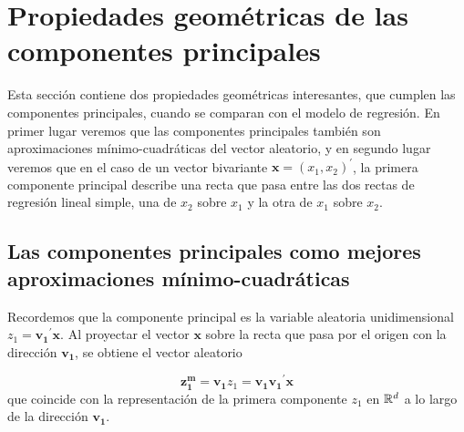 \documentclass[
  a4paper,
  oneside]{scrbook}
\newenvironment{Shaded}{\begin{snugshade}}{\end{snugshade}}
\newcommand{\DecValTok}[1]{\textcolor[rgb]{0.00,0.00,0.81}{#1}}
\newcommand{\FunctionTok}[1]{\textcolor[rgb]{0.13,0.29,0.53}{\textbf{#1}}}
\newcommand{\NormalTok}[1]{#1}
\newcommand{\OtherTok}[1]{\textcolor[rgb]{0.56,0.35,0.01}{#1}}
\newcommand{\SpecialCharTok}[1]{\textcolor[rgb]{0.81,0.36,0.00}{\textbf{#1}}}
\theoremstyle{definition}
\theoremstyle{definition}
\theoremstyle{definition}
\theoremstyle{definition}
\theoremstyle{remark}
\begin{document}
\begin{Shaded}
\end{Shaded}

\normalsize

\section{Propiedades geométricas de las componentes principales}\label{propiedades-geometricas-de-las-componentes-principales}

Esta sección contiene dos propiedades geométricas interesantes, que
cumplen las componentes principales, cuando se comparan con el modelo de
regresión. En primer lugar veremos que las componentes principales
también son aproximaciones mínimo-cuadráticas del vector aleatorio, y en
segundo lugar veremos que en el caso de un vector bivariante
\(\bm{x}=(x_1,x_2)^\prime{}\), la primera componente principal describe
una recta que pasa entre las dos rectas de regresión lineal simple, una
de \(x_2\) sobre \(x_1\) y la otra de \(x_1\) sobre \(x_2\).

\subsection{Las componentes principales como mejores aproximaciones mínimo-cuadráticas}\label{las-componentes-principales-como-mejores-aproximaciones-minimo-cuadraticas}

Recordemos que la componente principal es la variable aleatoria
unidimensional \(z_1=\bm{v_1}^{\prime} \bm{x}\). Al proyectar el vector
\(\bm{x}\) sobre la recta que pasa por el origen con la dirección
\(\bm{v_1}\), se obtiene el vector aleatorio

\[\bm{z_1^m}=\bm{v_1} z_1=\bm{v_1} \bm{v_1}^{\prime} \bm{x}\] que
coincide con la representación de la primera componente \(z_1\) en
\({\Bbb R}^d\) a lo largo de la dirección \(\bm{v_1}\).
\end{document}
